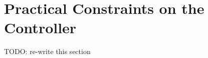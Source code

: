 \section{Practical Constraints on the Controller} \label{sec:constraints}
TODO: re-write this section
%
%
%
